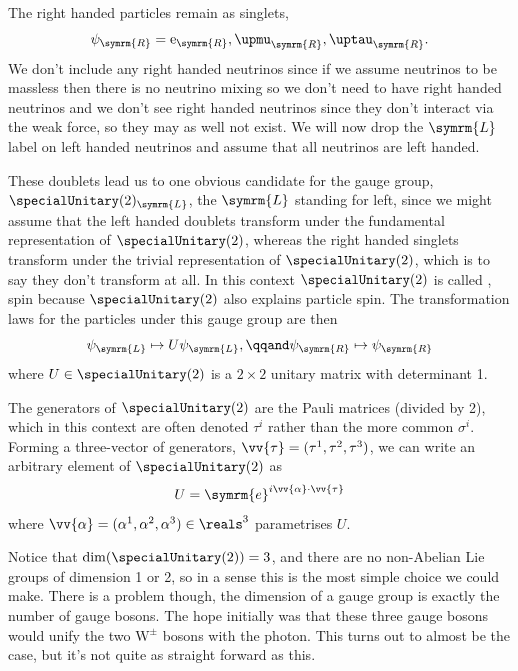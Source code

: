 \documentclass[fleqn]{NotesClass}
\newcommand{\Pparticle}[1]{\mathrm{#1}}
\newcommand{\Pex}{\ensuremath{\Pparticle{e}}}
\newcommand{\Pmux}{\ensuremath{\upmu}}
\newcommand{\Ptaux}{\ensuremath{\uptau}}
\newcommand{\PWpm}{\ensuremath{\Pparticle{W}^{\pm}}}
\newcommand{\e}{\symrm{e}}
\newcommand{\Left}{\symrm{L}}
\newcommand{\Right}{\symrm{R}}
\begin{document}
    The right handed particles remain as singlets,
    \begin{equation}
        \psi_{\Right} = \Pex_{\Right}, \Pmux_{\Right}, \Ptaux_{\Right}.
    \end{equation}
    We don't include any right handed neutrinos since if we assume neutrinos to be massless then there is no neutrino mixing so we don't need to have right handed neutrinos and we don't see right handed neutrinos since they don't interact via the weak force, so they may as well not exist.
    We will now drop the \(\Left\) label on left handed neutrinos and assume that all neutrinos are left handed.
    
    These doublets lead us to one obvious candidate for the gauge group, \(\specialUnitary(2)_{\Left}\), the \(\Left\) standing for left, since we might assume that the left handed doublets transform under the fundamental representation of \(\specialUnitary(2)\), whereas the right handed singlets transform under the trivial representation of \(\specialUnitary(2)\), which is to say they don't transform at all.
    In this context \(\specialUnitary(2)\) is called , spin because \(\specialUnitary(2)\) also explains particle spin.
    The transformation laws for the particles under this gauge group are then
    \begin{equation}
        \psi_{\Left} \mapsto U\psi_{\Left}, \qqand \psi_{\Right} \mapsto \psi_{\Right}
    \end{equation}
    where \(U \in \specialUnitary(2)\) is a \(2 \times 2\) unitary matrix with determinant 1.
    
    The generators of \(\specialUnitary(2)\) are the Pauli matrices (divided by 2), which in this context are often denoted \(\tau^i\) rather than the more common \(\sigma^i\).
    Forming a three-vector of generators, \(\vv{\tau} = (\tau^1, \tau^2, \tau^3)\), we can write an arbitrary element of \(\specialUnitary(2)\) as
    \begin{equation}
        U = \e^{i\vv{\alpha} \cdot \vv{\tau}}
    \end{equation}
    where \(\vv{\alpha} = (\alpha^1, \alpha^2, \alpha^3) \in \reals^3\) parametrises \(U\).
    
    Notice that \(\dim(\specialUnitary(2)) = 3\), and there are no non-Abelian Lie groups of dimension 1 or 2, so in a sense this is the most simple choice we could make.
    There is a problem though, the dimension of a gauge group is exactly the number of gauge bosons.
    The hope initially was that these three gauge bosons would unify the two \(\PWpm\) bosons with the photon.
    This turns out to almost be the case, but it's not quite as straight forward as this.
    
\end{document}
